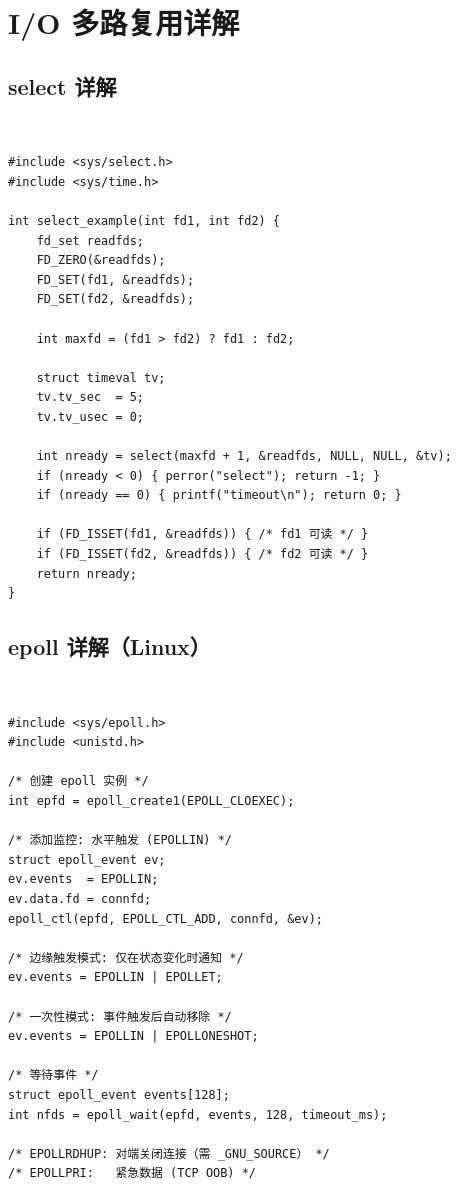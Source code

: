 \documentclass[12pt,a4paper,fontset=fandol]{ctexbook}
\newcommand{\posixlabel}{%
  \noindent\begin{tcolorbox}[sharp corners,colback=posixheadbg,colframe=posixheadbg,
    left=6pt,right=6pt,top=2pt,bottom=2pt,boxrule=0pt]
  \textcolor{white}{\small\bfseries\sffamily POSIX Sockets}\end{tcolorbox}%
}
\begin{document}
\appendix

\chapter{I/O 多路复用详解}

\section{select 详解}

\posixlabel
\begin{lstlisting}[style=cstyle]
#include <sys/select.h>
#include <sys/time.h>

int select_example(int fd1, int fd2) {
    fd_set readfds;
    FD_ZERO(&readfds);
    FD_SET(fd1, &readfds);
    FD_SET(fd2, &readfds);

    int maxfd = (fd1 > fd2) ? fd1 : fd2;

    struct timeval tv;
    tv.tv_sec  = 5;
    tv.tv_usec = 0;

    int nready = select(maxfd + 1, &readfds, NULL, NULL, &tv);
    if (nready < 0) { perror("select"); return -1; }
    if (nready == 0) { printf("timeout\n"); return 0; }

    if (FD_ISSET(fd1, &readfds)) { /* fd1 可读 */ }
    if (FD_ISSET(fd2, &readfds)) { /* fd2 可读 */ }
    return nready;
}
\end{lstlisting}

\section{epoll 详解（Linux）}

\posixlabel
\begin{lstlisting}[style=cstyle]
#include <sys/epoll.h>
#include <unistd.h>

/* 创建 epoll 实例 */
int epfd = epoll_create1(EPOLL_CLOEXEC);

/* 添加监控: 水平触发 (EPOLLIN) */
struct epoll_event ev;
ev.events  = EPOLLIN;
ev.data.fd = connfd;
epoll_ctl(epfd, EPOLL_CTL_ADD, connfd, &ev);

/* 边缘触发模式: 仅在状态变化时通知 */
ev.events = EPOLLIN | EPOLLET;

/* 一次性模式: 事件触发后自动移除 */
ev.events = EPOLLIN | EPOLLONESHOT;

/* 等待事件 */
struct epoll_event events[128];
int nfds = epoll_wait(epfd, events, 128, timeout_ms);

/* EPOLLRDHUP: 对端关闭连接（需 _GNU_SOURCE） */
/* EPOLLPRI:   紧急数据 (TCP OOB) */
\end{lstlisting}
\end{document}
